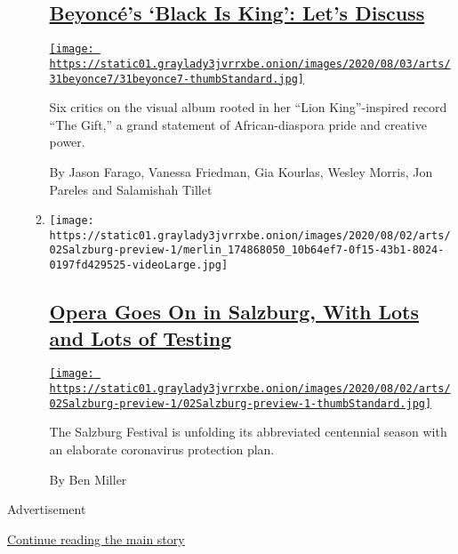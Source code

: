 \begin{enumerate}
\begin{enumerate}
    \hypertarget{beyoncuxe9s-black-is-king-lets-discuss}{%
    \subsection{\texorpdfstring{\href{/2020/07/31/arts/music/beyonce-black-is-king.html}{Beyoncé's
    `Black Is King': Let's
    Discuss}}{Beyoncé's `Black Is King': Let's Discuss}}\label{beyoncuxe9s-black-is-king-lets-discuss}}

    \href{/2020/07/31/arts/music/beyonce-black-is-king.html}{\texttt{[image: https://static01.graylady3jvrrxbe.onion/images/2020/08/03/arts/31beyonce7/31beyonce7-thumbStandard.jpg]}}

    Six critics on the visual album rooted in her ``Lion King''-inspired
    record ``The Gift,'' a grand statement of African-diaspora pride and
    creative power.

    By Jason Farago, Vanessa Friedman, Gia Kourlas, Wesley Morris, Jon
    Pareles and Salamishah Tillet
  \item
    \texttt{[image: https://static01.graylady3jvrrxbe.onion/images/2020/08/02/arts/02Salzburg-preview-1/merlin\_174868050\_10b64ef7-0f15-43b1-8024-0197fd429525-videoLarge.jpg]}

    \hypertarget{opera-goes-on-in-salzburg-with-lots-and-lots-of-testing}{%
    \subsection{\texorpdfstring{\href{/2020/07/31/arts/music/salzburg-festival-coronavirus-cosi.html}{Opera
    Goes On in Salzburg, With Lots and Lots of
    Testing}}{Opera Goes On in Salzburg, With Lots and Lots of Testing}}\label{opera-goes-on-in-salzburg-with-lots-and-lots-of-testing}}

    \href{/2020/07/31/arts/music/salzburg-festival-coronavirus-cosi.html}{\texttt{[image: https://static01.graylady3jvrrxbe.onion/images/2020/08/02/arts/02Salzburg-preview-1/02Salzburg-preview-1-thumbStandard.jpg]}}

    The Salzburg Festival is unfolding its abbreviated centennial season
    with an elaborate coronavirus protection plan.

    By Ben Miller
  \end{enumerate}
\end{enumerate}

Advertisement

\protect\hyperlink{after-mid1}{Continue reading the main story}

